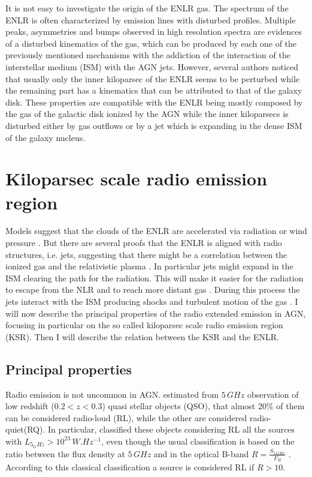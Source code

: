 \documentclass[../thesis.tex]{subfiles}
\begin{document}
It is not easy to investigate the origin of the ENLR gas.
The spectrum of the ENLR is often characterized by emission lines with disturbed profiles.
Multiple peaks, asymmetries and bumps observed in high resolution spectra \citep{Ozaki09,Morganti07,Congiu17} are evidences of a disturbed kinematics of the gas, which can be produced by each one of the previously mentioned mechanisms with the addiction of the interaction of the interstellar medium (ISM) with the AGN jets.
However, several authors \citep[e.g.][]{Unger87,Fischer17,Fischer18} noticed that usually only the inner kiloparsec of the ENLR seems to be perturbed while the remaining part has a kinematics that can be attributed to that of the galaxy disk.
These properties are compatible with the ENLR being mostly composed by the gas of the galactic disk ionized by the AGN while the inner kiloparsecs is disturbed either by gas outflows or by a jet which is expanding in the dense ISM of the galaxy nucleus.



\section{Kiloparsec scale radio emission region}
\label{sec:ksr}

Models suggest that the clouds of the ENLR are accelerated via radiation or wind pressure \citep{Crenshaw00,Crenshaw00b}.
But there are several proofs that the ENLR is aligned with radio structures, i.e. jets, suggesting that there might be a correlation between the ionized gas and the relativistic plasma \citep[e.g.][]{Unger87,Wilson94,Falcke98,Schmitt03,Schmitt03b,Morganti07,Husemann13}.
In particular jets might expand in the ISM clearing the path for the radiation.
This will make it easier for the radiation to escape from the NLR and to reach more distant gas \citep{Wilson94}.
During this process the jets interact with the ISM producing shocks and turbulent motion of the gas \citep[e.g.][]{Cracco11,Contini13,Congiu17}.
I will now describe the principal properties of the radio extended emission in AGN, focusing in particular on the so called kiloparsec scale radio emission region (KSR).
Then I will describe the relation between the KSR and the ENLR.

\subsection{Principal properties}
\label{sec:princ_prop}

Radio emission is not uncommon in AGN.
\citet{Kellermann16} estimated from $5\,\si{GHz}$ observation of low redshift ($0.2<z<0.3$) quasi stellar objects (QSO), that almost $20\%$ of them can be considered radio-loud (RL), while the other are considered radio-quiet(RQ).
In particular, \citet{Kellermann16} classified these objects considering RL all the sources with $L_{5_GHz}>10^{23}\,\si{W.Hz^{-1}}$, even though the usual classification is based on the ratio between the flux density at $5\,\si{GHz}$ and in the optical B-band $R=\frac{S_{5\,\si{GHz}}}{F_{B}}$ \citep{Kellermann89}.
According to this classical classification a source is considered RL if $R>10$.
\end{document}
